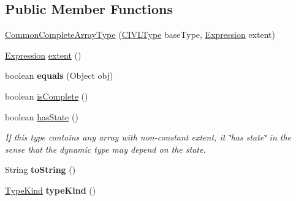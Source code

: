 \subsection*{Public Member Functions}
\begin{DoxyCompactItemize}
\item 
\hyperlink{classedu_1_1udel_1_1cis_1_1vsl_1_1civl_1_1model_1_1common_1_1type_1_1CommonCompleteArrayType_a5b2fd61c83d26dc5863309962166e2b1}{Common\+Complete\+Array\+Type} (\hyperlink{interfaceedu_1_1udel_1_1cis_1_1vsl_1_1civl_1_1model_1_1IF_1_1type_1_1CIVLType}{C\+I\+V\+L\+Type} base\+Type, \hyperlink{interfaceedu_1_1udel_1_1cis_1_1vsl_1_1civl_1_1model_1_1IF_1_1expression_1_1Expression}{Expression} extent)
\item 
\hyperlink{interfaceedu_1_1udel_1_1cis_1_1vsl_1_1civl_1_1model_1_1IF_1_1expression_1_1Expression}{Expression} \hyperlink{classedu_1_1udel_1_1cis_1_1vsl_1_1civl_1_1model_1_1common_1_1type_1_1CommonCompleteArrayType_a632dc36261cf7a9cea19f1d1bdef4383}{extent} ()
\item 
\hypertarget{classedu_1_1udel_1_1cis_1_1vsl_1_1civl_1_1model_1_1common_1_1type_1_1CommonCompleteArrayType_a5485abce83716ae08f10a4eff4554256}{}boolean {\bfseries equals} (Object obj)\label{classedu_1_1udel_1_1cis_1_1vsl_1_1civl_1_1model_1_1common_1_1type_1_1CommonCompleteArrayType_a5485abce83716ae08f10a4eff4554256}

\item 
boolean \hyperlink{classedu_1_1udel_1_1cis_1_1vsl_1_1civl_1_1model_1_1common_1_1type_1_1CommonCompleteArrayType_aa560603cd53e4df6e296e07f6596fd12}{is\+Complete} ()
\item 
boolean \hyperlink{classedu_1_1udel_1_1cis_1_1vsl_1_1civl_1_1model_1_1common_1_1type_1_1CommonCompleteArrayType_a3e5f98bd92c8ca49e904fcfffd386c02}{has\+State} ()
\begin{DoxyCompactList}\small\item\em If this type contains any array with non-\/constant extent, it \char`\"{}has state\char`\"{} in the sense that the dynamic type may depend on the state. \end{DoxyCompactList}\item 
\hypertarget{classedu_1_1udel_1_1cis_1_1vsl_1_1civl_1_1model_1_1common_1_1type_1_1CommonCompleteArrayType_a0f6ccdec2462304f54e60b26c81db59d}{}String {\bfseries to\+String} ()\label{classedu_1_1udel_1_1cis_1_1vsl_1_1civl_1_1model_1_1common_1_1type_1_1CommonCompleteArrayType_a0f6ccdec2462304f54e60b26c81db59d}

\item 
\hypertarget{classedu_1_1udel_1_1cis_1_1vsl_1_1civl_1_1model_1_1common_1_1type_1_1CommonCompleteArrayType_a6d409434fc0ebb3419bd3a6dbb9a3317}{}\hyperlink{enumedu_1_1udel_1_1cis_1_1vsl_1_1civl_1_1model_1_1IF_1_1type_1_1CIVLType_1_1TypeKind}{Type\+Kind} {\bfseries type\+Kind} ()\label{classedu_1_1udel_1_1cis_1_1vsl_1_1civl_1_1model_1_1common_1_1type_1_1CommonCompleteArrayType_a6d409434fc0ebb3419bd3a6dbb9a3317}


\end{DoxyCompactItemize}
